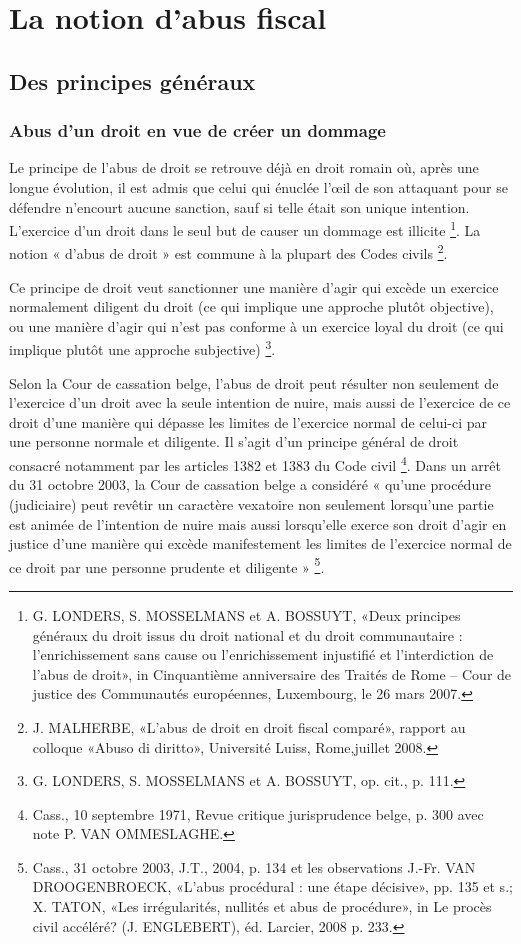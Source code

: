 \documentclass[12pt]{report}
\begin{document}
\chapter{La notion d'abus fiscal}

\section{Des principes généraux}
\subsection{Abus d’un droit en vue de créer un dommage}
Le principe de l’abus de droit se retrouve déjà en droit romain où, après une longue évolution, il est admis que celui qui énuclée l’œil de son attaquant pour se défendre n’encourt aucune sanction, sauf si telle était son unique intention. L’exercice d’un droit dans le seul but de causer un dommage est illicite \footnote{G. LONDERS, S. MOSSELMANS et A. BOSSUYT, «Deux principes  généraux du droit issus du droit national et du droit communautaire : l’enrichissement sans cause ou l’enrichissement injustifié et l’interdiction de l’abus de droit», in Cinquantième anniversaire des Traités de Rome – Cour de justice des Communautés européennes, Luxembourg, le 26 mars 2007.}. La notion « d’abus de droit » est commune à la plupart des Codes civils \footnote{J. MALHERBE, «L’abus de droit en droit fiscal comparé», rapport au colloque «Abuso di diritto», Université Luiss, Rome,juillet 2008.}.

Ce principe de droit veut sanctionner une manière d’agir qui excède un exercice normalement diligent du droit (ce qui implique une approche plutôt objective), ou une manière d’agir qui n’est pas conforme à un exercice loyal du droit (ce qui implique plutôt une approche subjective) \footnote{G. LONDERS, S. MOSSELMANS et A. BOSSUYT, op. cit., p. 111.}.

Selon la Cour de cassation belge, l’abus de droit peut résulter non seulement de l’exercice d’un droit avec la seule intention de nuire, mais aussi de l’exercice de ce droit d’une manière qui dépasse les limites de l’exercice normal de celui-ci par une personne normale et diligente. Il s’agit d’un principe général de droit consacré notamment par les articles 1382 et 1383 du Code civil \footnote{Cass., 10 septembre 1971, Revue critique jurisprudence belge, p. 300 avec note P. VAN OMMESLAGHE.}. Dans un arrêt du 31 octobre 2003, la Cour de cassation belge a considéré « qu’une procédure (judiciaire) peut revêtir un caractère vexatoire non seulement lorsqu’une partie est animée de l’intention de nuire mais aussi lorsqu’elle exerce son droit d’agir en justice d’une manière qui excède manifestement les limites de l’exercice normal de ce droit par une personne prudente et diligente » \footnote{Cass., 31 octobre 2003, J.T., 2004, p. 134 et les observations J.-Fr. VAN DROOGENBROECK, «L’abus procédural : une étape décisive», pp. 135 et s.; X. TATON, «Les irrégularités, nullités et abus de procédure», in Le procès civil accéléré? (J. ENGLEBERT), éd. Larcier, 2008 p. 233.}.
\end{document}
